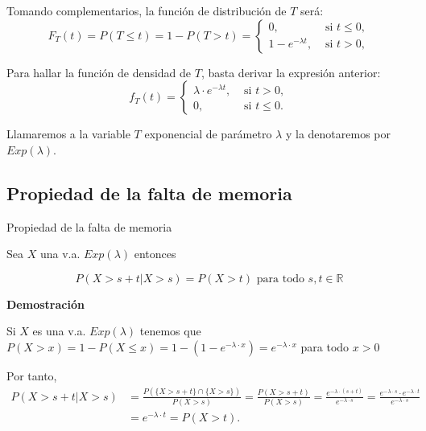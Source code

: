 \documentclass[
  letterpaper,
  DIV=11,
  numbers=noendperiod]{scrreprt}
\begin{document}
Tomando complementarios, la función de distribución de \(T\) será: \[
F_{T}(t)= P(T\leq t)=1-P(T>t)=\left\{\begin{array}{ll} 0, &\mbox{ si } t\leq 0,\\
 1-e^{-\lambda t},& \mbox{ si } t>0,\end{array}\right.
\]

Para hallar la función de densidad de \(T\), basta derivar la expresión
anterior: \[
f_{T}(t)=\left\{\begin{array}{ll}\lambda \cdot e^{-\lambda t}, & \mbox{ si } t>0,\\
0, & \mbox{ si } t\leq 0. \end{array}\right.
\]

Llamaremos a la variable \(T\) exponencial de parámetro \(\lambda\) y la
denotaremos por \(Exp(\lambda)\).

\subsection{Propiedad de la falta de
memoria}\label{propiedad-de-la-falta-de-memoria-1}

\begin{Proposicion}{Propiedad de la falta de memoria}{}

Sea \(X\) una v.a. \(Exp(\lambda)\) entonces

\[P(X>s+t\big|X>s)=P(X>t)\mbox{ para todo } s,t\in \mathbb{R}\]

\end{Proposicion}

\textbf{Demostración}

Si \(X\) es una v.a. \(Exp(\lambda)\) tenemos que
\(P(X>x)=1-P(X\leq x)=1-(1-e^{-\lambda\cdot x})=e^{-\lambda\cdot x}\)
para todo \(x>0\)

Por tanto, \[
\begin{array}{rl}
P(X>s+t\big|X>s) & =\frac{P(\{X>s+t\}\cap \{X>s\})}{P(X>s)}=\frac{P(X>s+t)}{P(X>s)}=\frac{e^{-\lambda\cdot (s+t)}}{e^{-\lambda\cdot s}}=
\frac{e^{-\lambda\cdot s}\cdot e^{-\lambda\cdot t} }{e^{-\lambda\cdot s}}\\ & =e^{-\lambda\cdot t}=P(X>t).
\end{array}
\]
\end{document}
